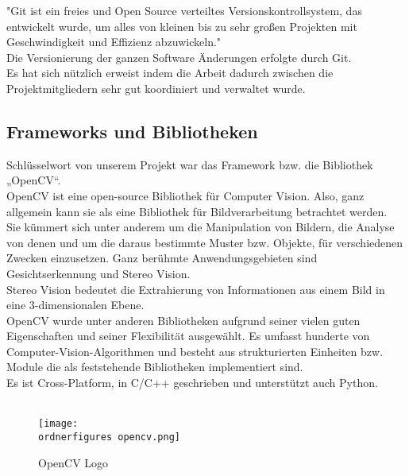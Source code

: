 "Git ist ein freies und Open Source verteiltes Versionskontrollsystem, das entwickelt wurde, um alles von kleinen bis zu sehr großen Projekten mit Geschwindigkeit und Effizienz abzuwickeln." \cite{Git1} \\
Die Versionierung der ganzen Software Änderungen erfolgte durch Git.\\
Es hat sich nützlich erweist indem die Arbeit dadurch zwischen die Projektmitgliedern sehr gut koordiniert und verwaltet wurde. \\ 


\subsection{Frameworks und Bibliotheken}

Schlüsselwort von unserem Projekt war das Framework bzw. die Bibliothek „OpenCV“.\\
OpenCV ist eine open-source Bibliothek für Computer Vision. Also, ganz allgemein kann sie als eine Bibliothek für Bildverarbeitung betrachtet werden.\\
Sie kümmert sich unter anderem um die Manipulation von Bildern, die Analyse von denen und um die daraus bestimmte Muster bzw. Objekte, für verschiedenen Zwecken einzusetzen. Ganz berühmte Anwendungsgebieten sind Gesichtserkennung und Stereo Vision. \\
Stereo Vision bedeutet die Extrahierung von Informationen aus einem Bild in eine 3-dimensionalen Ebene. \\
OpenCV wurde unter anderen Bibliotheken aufgrund seiner vielen guten Eigenschaften und seiner Flexibilität ausgewählt. Es umfasst hunderte von Computer-Vision-Algorithmen und besteht aus strukturierten Einheiten bzw. Module die als feststehende Bibliotheken implementiert sind. \\
Es ist Cross-Platform, in C/C++ geschrieben und unterstützt auch Python. \\
\cite{opencv_library}
\\
\begin{figure}[H]
	\texttt{[image: \\ordnerfigures opencv.png]}
	\caption{OpenCV Logo}
	\label{fig:OpenCV logo} 
	\cite{OpencvLogo}
\end{figure}



